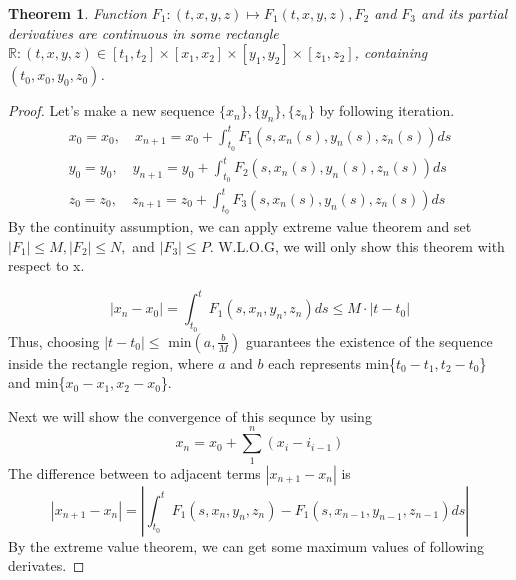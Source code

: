 \documentclass[a4paper,10pt]{article}
\newtheorem{theorem}{Theorem}[section]
\begin{document}
    \begin{theorem}
        Function $F_1: (t, x, y, z) \mapsto F_1(t, x, y,z), F_2$ and $F_3$ and its partial derivatives are continuous in some rectangle $\mathbb{R}: (t, x, y, z) \in \left[ t_1, t_2 \right] \times \left[ x_1, x_2 \right] \times \left[ y_1, y_2 \right] \times \left[ z_1, z_2 \right]$, containing $(t_0, x_0, y_0, z_0)$.
    \end{theorem}
        
    \begin{proof}
        Let's make a new sequence $\{ x_n\}, \{ y_n\}, \{ z_n\}$ by following iteration.
        \begin{eqnarray*}
            x_0 = x_0, \quad x_{n+1} = x_0 + \int_{t_0}^{t} F_1(s, x_n(s), y_n(s), z_n(s)) ds \\
            y_0 = y_0, \quad y_{n+1} = y_0 + \int_{t_0}^{t} F_2(s, x_n(s), y_n(s), z_n(s)) ds \\
            z_0 = z_0, \quad z_{n+1} = z_0 + \int_{t_0}^{t} F_3(s, x_n(s), y_n(s), z_n(s)) ds
        \end{eqnarray*}
        By the continuity assumption, we can apply extreme value theorem and set $|F_1| \leq M, |F_2| \leq N,$ and $|F_3| \leq P$. W.L.O.G, we will only show this theorem with respect to x.

        \begin{displaymath}
            |x_n - x_0| = \int_{t_0}^{t} F_1(s, x_n, y_n, z_n) ds \leq M \cdot |t - t_0|
        \end{displaymath}
        Thus, choosing $|t - t_0| \leq$ min$(a, \frac{b}{M})$ guarantees the existence of the sequence inside the rectangle region, where $a$ and $b$ each represents min\{$t_0 - t_1, t_2 - t_0$\} and min\{$x_0 - x_1, x_2 - x_0$\}.

        Next we will show the convergence of this sequnce by using
        \begin{displaymath}
            x_n = x_0 + \sum_{1}^{n} (x_i - i_{i-1})
        \end{displaymath}
        The difference between to adjacent terms $|x_{n+1} - x_{n}|$ is 
        \begin{displaymath}
            |x_{n+1} - x_{n}| = \left| \int_{t_0}^t F_1(s, x_{n}, y_{n}, z_{n}) - F_1(s, x_{n-1}, y_{n-1}, z_{n-1}) ds \right|
        \end{displaymath}
        By the extreme value theorem, we can get some maximum values of following derivates.


\end{proof}
\end{document}
